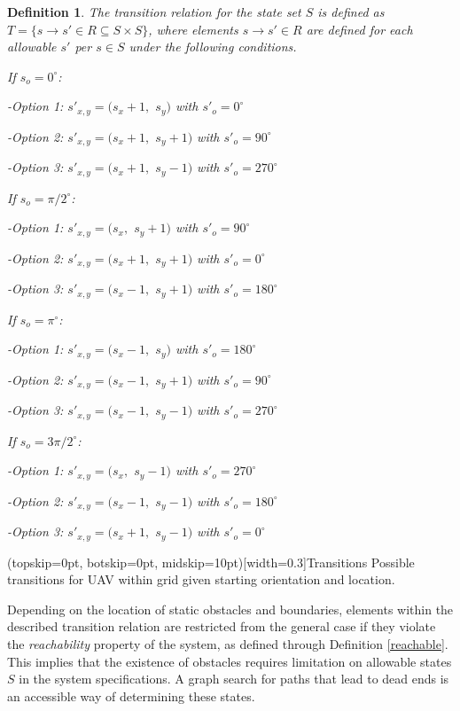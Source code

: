 \documentclass{ieeeaccess}
\newtheorem{definition}{Definition}
\begin{document}
\begin{definition}
	\label{definition7}
	The transition relation for the state set $S$ is defined as $T = \{s \to s' \in R \subseteq S \times S\}$, where elements $s \to s' \in R$ are defined for each allowable $s'$ per $s \in S$ under the following conditions.
	
	If $s_o = 0^\circ$: 
	
	-Option 1: $s'_{x,y} = (s_x+1,$ $s_y)$ with $s'_o = 0^\circ$
	
	-Option 2: $s'_{x,y} = (s_x+1,$ $s_y+1)$ with $s'_o = 90^\circ$
	
	-Option 3: $s'_{x,y} = (s_x+1,$ $s_y-1)$ with $s'_o = 270^\circ$
	
	If $s_o = \pi/2^\circ$: 
	
	-Option 1: $s'_{x,y} = (s_x,$ $s_y+1)$ with $s'_o = 90^\circ$
	
	-Option 2: $s'_{x,y} = (s_x+1,$ $s_y+1)$ with $s'_o = 0^\circ$
	
	-Option 3: $s'_{x,y} = (s_x-1,$ $s_y+1)$ with $s'_o = 180^\circ$
	
	If $s_o = \pi^\circ$: 
	
	-Option 1: $s'_{x,y} = (s_x-1,$ $s_y)$ with $s'_o = 180^\circ$
	
	-Option 2: $s'_{x,y} = (s_x-1,$ $s_y+1)$ with $s'_o = 90^\circ$
	
	-Option 3: $s'_{x,y} = (s_x-1,$ $s_y-1)$ with $s'_o = 270^\circ$
	
	If $s_o = 3\pi/2^\circ$: 
	
	-Option 1: $s'_{x,y} = (s_x,$ $s_y-1)$ with $s'_o =270^\circ$
	
	-Option 2: $s'_{x,y} = (s_x-1,$ $s_y-1)$ with $s'_o = 180^\circ$
	
	-Option 3: $s'_{x,y} = (s_x+1,$ $s_y-1)$ with $s'_o = 0^\circ$
\end{definition}

\Figure[t!](topskip=0pt, botskip=0pt, midskip=10pt)[width=0.3\textwidth]{Transitions}
{Possible transitions for UAV within grid given starting orientation and location.\label{transitions}}

Depending on the location of static obstacles and boundaries, elements within the described transition relation are restricted from the general case if they violate the \textit{reachability} property of the system, as defined through Definition \ref{reachable}. This implies that the existence of obstacles requires limitation on allowable states $S$ in the system specifications. A graph search for paths that lead to dead ends is an accessible way of determining these states.
\end{document}
